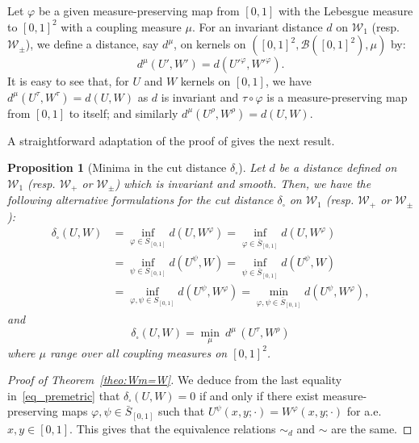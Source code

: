 \documentclass{amsart}
\newcommand{\aE}{a.e.\ }
\theoremstyle{plain}
\newtheorem{prop}[Th]{Proposition}
\theoremstyle{definition}
\newcommand{\signed}{\pm}
\newcommand{\Graphon}{\mathcal{W}_1}
\newcommand{\Kernel}{\mathcal{W}_{\signed}}
\newcommand{\Kernelp}{\mathcal{W}_{+}}
\newcommand{\InvRelabel}{S_{[0,1]}}
\newcommand{\Relabel}{\bar{S}_{[0,1]}}
\newcommand{\simd}{\sim_{d}}
\newcommand{\dd}{\delta_{\square}}
\begin{document}
Let $\varphi$
be a given measure-preserving map
from $[0,1]$ with the Lebesgue measure to $[0,1]^2$ with a coupling  measure
$\mu$. For an invariant  distance $d$ on $\Graphon$ (resp. $\Kernel$), we
define  a distance, say $d^\mu$,  on kernels on
$([0,1]^2,\mathcal{B}([0,1]^2),\mu)$ by:
\[
  d^\mu(U',W') = d(U'^{\varphi}, W'^{\varphi}). 
\]
It is easy to see that, for $U$ and $W$ kernels on $[0,1]$, 
we have
$d ^ \mu(U^\tau,W^\tau) = d(U,W)$ as $d$ is invariant  and $\tau \circ \varphi$ is a
measure-preserving  map from $[0, 1]$ to itself; and similarly $d ^ \mu(U^\rho,W^\rho) = d(U,W)$.



A straightforward adaptation of 
the proof of \cite[Theorem~8.13]{Lovasz}
gives the next  result.


\begin{prop}[Minima in the cut distance $\dd$]\label{thm_min_dist}
  Let $d$ be a distance defined on $\Graphon$ (resp.  $\Kernelp$ or $\Kernel$)
   which is invariant  and smooth.   Then,  we  have  the
  following alternative  formulations for  the cut distance  $\dd$ on
  $\Graphon$ (resp. $\Kernelp$ or $\Kernel$):
\begin{equation}
  \label{eq_premetric}
  \begin{aligned}
\dd(U,W) 
& = \underset{\varphi\in \InvRelabel}{\inf} d(U,W^\varphi) 
  = \underset{\varphi\in \Relabel}{\inf} d(U,W^\varphi)\\
& = \underset{\psi\in \InvRelabel}{\inf} d(U^\psi,W) 
= \underset{\psi\in \Relabel}{\inf} d(U^\psi,W) 	\\
& = \underset{\varphi, \psi\in \InvRelabel}{\inf} d(U^\psi,W^\varphi) 
= \underset{\varphi,\psi\in \Relabel}{\min} d(U^\psi,W^\varphi) , 
\end{aligned}
\end{equation}
and 
\begin{equation*}
\dd(U,W) 
= \underset{\mu}{\min}\ d^{\mu} \, (U^\tau, W^\rho)
\end{equation*}
where $\mu$ range over all coupling measures on $[0,1]^2$.
\end{prop}


\begin{proof}[Proof of  Theorem~\ref{theo:Wm=W}]
 We deduce from the last equality in~\eqref{eq_premetric}
that $\dd(U,W) =  0$ if and  only if there  exist measure-preserving    maps    
	$\varphi, \psi \in \Relabel$    such    that  
$U^\psi(x,y;\cdot) =  W^\varphi(x,y;\cdot)$ for \aE $x,y\in[0,1]$.  
This gives that the equivalence relations $\simd$ and $\sim$ are the
same. 
\end{proof}
\end{document}

